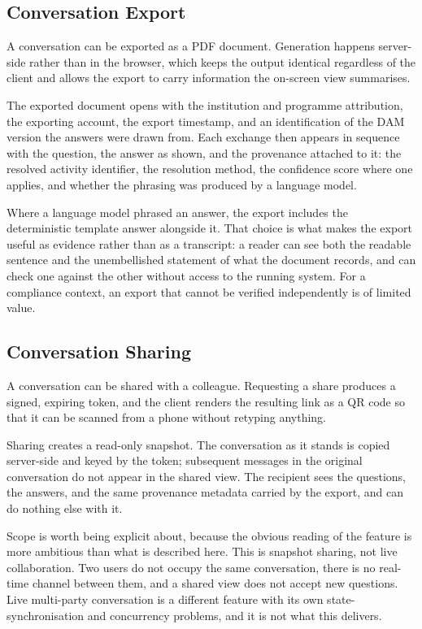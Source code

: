 \subsection{Conversation Export}

A conversation can be exported as a PDF document. Generation happens server-side rather than in the browser, which keeps the output identical regardless of the client and allows the export to carry information the on-screen view summarises.

The exported document opens with the institution and programme attribution, the exporting account, the export timestamp, and an identification of the DAM version the answers were drawn from. Each exchange then appears in sequence with the question, the answer as shown, and the provenance attached to it: the resolved activity identifier, the resolution method, the confidence score where one applies, and whether the phrasing was produced by a language model.

Where a language model phrased an answer, the export includes the deterministic template answer alongside it. That choice is what makes the export useful as evidence rather than as a transcript: a reader can see both the readable sentence and the unembellished statement of what the document records, and can check one against the other without access to the running system. For a compliance context, an export that cannot be verified independently is of limited value.

\subsection{Conversation Sharing}

A conversation can be shared with a colleague. Requesting a share produces a signed, expiring token, and the client renders the resulting link as a QR code so that it can be scanned from a phone without retyping anything.

Sharing creates a read-only snapshot. The conversation as it stands is copied server-side and keyed by the token; subsequent messages in the original conversation do not appear in the shared view. The recipient sees the questions, the answers, and the same provenance metadata carried by the export, and can do nothing else with it.

Scope is worth being explicit about, because the obvious reading of the feature is more ambitious than what is described here. This is snapshot sharing, not live collaboration. Two users do not occupy the same conversation, there is no real-time channel between them, and a shared view does not accept new questions. Live multi-party conversation is a different feature with its own state-synchronisation and concurrency problems, and it is not what this delivers.

